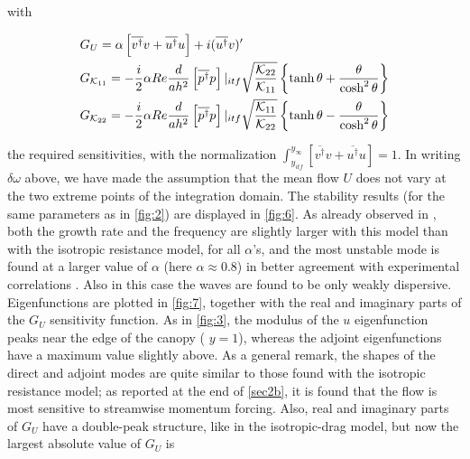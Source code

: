 with

\begin{equation}
\begin{split}
& G_U = \alpha  \left[  \overline{v^{\dagger}} v +  \overline{u^{\dagger}} u \right] + i ( \overline{u^{\dagger}} v)'  \vspace{0.3cm}\\
& G_{\mathcal{K}_{11}} = -\dfrac{i}{2} \alpha Re \dfrac{d}{a h^2}  \left[  \overline{p^{\dagger}} p \right]|_{itf} \sqrt{\dfrac{\mathcal{K}_{22}}{\mathcal{K}_{11}}} \left\lbrace \tanh \theta + \dfrac{\theta}{\cosh^2 \theta}\right\rbrace	\vspace{0.3cm}\\
& G_{\mathcal{K}_{22}} = -\dfrac{i}{2} \alpha Re \dfrac{d}{a h^2}  \left[  \overline{p^{\dagger}} p \right]|_{itf} \sqrt{\dfrac{\mathcal{K}_{11}}{\mathcal{K}_{22}}} \left\lbrace \tanh \theta - \dfrac{\theta}{\cosh^2 \theta}\right\rbrace
\end{split}
\end{equation}


the required sensitivities, with the normalization  $\int_{y_{itf}}^{y_{\infty}} \left[  \overline{v^{\dagger}} v +  \overline{u^{\dagger}} u \right] = 1$.
In writing $\delta \omega$ above, we have made the assumption that the mean flow $U$ does not vary at the two extreme points of the
integration domain.
The stability results (for the same parameters as in \ref{fig:2}) are displayed in \ref{fig:6}. As already
observed in \cite{zampogna2016instability}, both the growth rate and the frequency are slightly larger with this model than
with the isotropic resistance model, for all $\alpha$’s, and the most unstable mode is found at a larger
value of $\alpha$ (here $\alpha \approx 0.8$) in better agreement with experimental correlations \cite{zampogna2016instability} \cite{raupach1996coherent}.  Also in this case the
waves are found to be only weakly dispersive.
Eigenfunctions are plotted in \ref{fig:7}, together with the real and imaginary parts of the $G_U$
sensitivity function. As in \ref{fig:3}, the modulus of the $u$ eigenfunction peaks near the edge of the
canopy ( $y = 1$), whereas the adjoint eigenfunctions have a maximum value slightly above. As a
general remark, the shapes of the direct and adjoint modes are quite similar to those found with
the isotropic resistance model; as reported at the end of \ref{sec2b}, it is found that the flow
is most sensitive to streamwise momentum forcing. Also, real and imaginary parts of $G_U$ have a
double-peak structure, like in the isotropic-drag model, but now the largest absolute value of $G_U$ is

